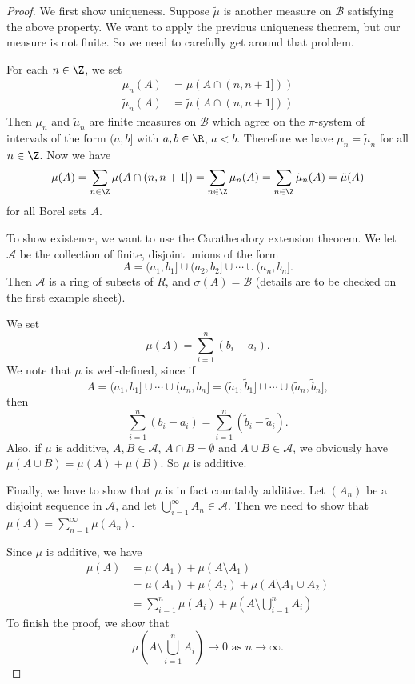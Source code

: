 \documentclass[a4paper]{article}
\begin{document}
\begin{proof}
  We first show uniqueness. Suppose $\tilde{\mu}$ is another measure on $\mathcal{B}$ satisfying the above property. We want to apply the previous uniqueness theorem, but our measure is not finite. So we need to carefully get around that problem.
  
  For each $n \in \Z$, we set
  \begin{align*}
    \mu_n(A) &= \mu(A \cap (n, n + 1]))\\
    \tilde{\mu}_n(A) &= \tilde{\mu}(A \cap (n, n + 1]))
  \end{align*}
  Then $\mu_n$ and $\tilde{\mu}_n$ are finite measures on $\mathcal{B}$ which agree on the $\pi$-system of intervals of the form $(a, b]$ with $a, b \in \R$, $a < b$. Therefore we have $\mu_n = \tilde{\mu}_n$ for all $n \in \Z$. Now we have
  \[
    \mu(A) = \sum_{n \in \Z} \mu(A \cap (n, n + 1]) = \sum_{n\in \Z}\mu_n(A) = \sum_{n \in \Z}\tilde{\mu}_n(A) = \tilde{\mu}(A)
  \]
  for all Borel sets $A$.

  To show existence, we want to use the Caratheodory extension theorem. We let $\mathcal{A}$ be the collection of finite, disjoint unions of the form
  \[
    A = (a_1, b_1] \cup (a_2, b_2] \cup \cdots \cup (a_n, b_n].
  \]
  Then $\mathcal{A}$ is a ring  of subsets of $R$, and $\sigma(A) = \mathcal{B}$ (details are to be checked on the first example sheet).

  We set
  \[
    \mu(A) = \sum_{i = 1}^n (b_i - a_i).
  \]
  We note that $\mu$ is well-defined, since if
  \[
    A = (a_1, b_1] \cup \cdots \cup (a_n, b_n] = (\tilde{a}_1, \tilde{b}_1] \cup \cdots \cup (\tilde{a}_n, \tilde{b}_n],
  \]
  then
  \[
    \sum_{i = 1}^n (b_i - a_i) = \sum_{i = 1}^n (\tilde{b}_i - \tilde{a}_i).
  \]
  Also, if $\mu$ is additive, $A, B \in \mathcal{A}$, $A \cap B = \emptyset$ and $A \cup B \in \mathcal{A}$, we obviously have $\mu(A \cup B) = \mu(A) + \mu(B)$. So $\mu$ is additive.

  Finally, we have to show that $\mu$ is in fact countably additive. Let $(A_n)$ be a disjoint sequence in $\mathcal{A}$, and let $\bigcup_{i = 1}^\infty A_n \in \mathcal{A}$. Then we need to show that $\mu(A) = \sum_{n = 1}^\infty \mu(A_n)$.

  Since $\mu$ is additive, we have
  \begin{align*}
    \mu(A) &= \mu(A_1) + \mu(A \setminus A_1) \\
    &= \mu(A_1) + \mu(A_2) + \mu(A \setminus A_1 \cup A_2)\\
    &= \sum_{i = 1}^n \mu(A_i) + \mu\left(A \setminus \bigcup_{i = 1}^n A_i\right)
  \end{align*}
  To finish the proof, we show that 
  \[
    \mu\left(A \setminus \bigcup_{i = 1}^n A_i\right) \to 0\text{ as }n \to \infty.
  \]
\end{proof}

\printindex
\end{document}
